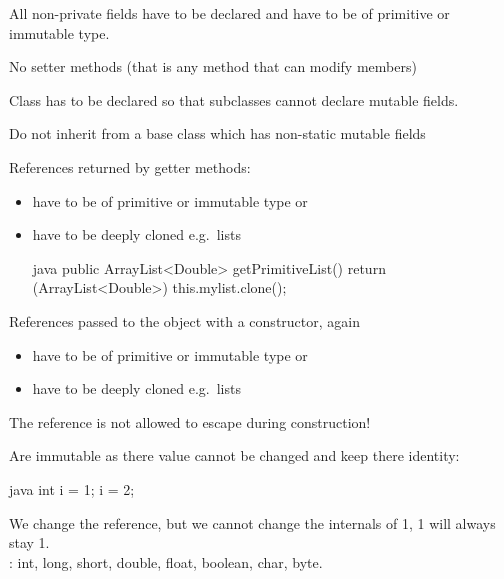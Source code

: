 \begin{sectionbox}\nospacing
  \begin{itemizenosep}
      \item All non-private fields have to be declared  and
      have to be of primitive or immutable type.
      \item No setter methods (that is any method that can modify members)
      \item Class has to be declared  so that subclasses
    cannot declare mutable fields.
      \item Do not inherit from a base class which has non-static mutable fields
      \item References returned by getter methods:
    \begin{itemize}
        \item have to be of primitive or immutable type or 
        \item have to be deeply cloned e.g.\ lists
        \begin{mintlinebox}{java}
          public ArrayList<Double> getPrimitiveList() {
            return (ArrayList<Double>) this.mylist.clone();
          }
        \end{mintlinebox}
    \end{itemize}
      \item References passed to the object with a constructor, again
    \begin{itemize}
        \item have to be of primitive or immutable type or 
        \item have to be deeply cloned e.g.\ lists
    \end{itemize}
      \item The  reference is not allowed to escape during construction!
  \end{itemizenosep}
\end{sectionbox}
\begin{defnbox}\nospacing
  \begin{defn}\label{defn:Primitives}
    Are immutable as there value cannot be changed and
    keep there identity:
    \begin{mintlinebox}{java}
      int i = 1;
          i = 2;
    \end{mintlinebox}
    We change the reference, but we cannot change the internals of 1, 1 will
    always stay 1.\\
    : int, long, short, double, float, boolean, char, byte.
  \end{defn}
\end{defnbox}

